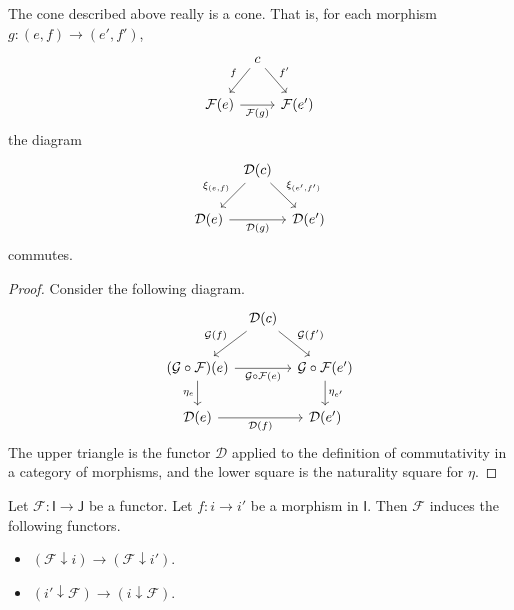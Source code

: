 \documentclass[notes.tex]{subfiles}
\begin{document}
\begin{lemma}
  \label{lemma:right_extension_induces_cone}
  The cone described above really is a cone. That is, for each morphism $g\colon (e, f) \to (e', f')$,
  \begin{equation*}
    \begin{tikzcd}[column sep=tiny]
      & c
      \arrow[ld, swap, "f"]
      \arrow[rd, "f'"]
      \\
      \mathcal{F}(e)
      \arrow[rr, swap, "\mathcal{F}(g)"]
      && \mathcal{F}(e')
    \end{tikzcd}
  \end{equation*}
  the diagram
  \begin{equation*}
    \begin{tikzcd}[column sep=tiny]
      & \mathcal{D}(c)
      \arrow[dl, swap, "\xi_{(e, f)}"]
      \arrow[dr, "\xi_{(e', f')}"]
      \\
      \mathcal{D}(e)
      \arrow[rr, swap, "\mathcal{D}(g)"]
      && \mathcal{D}(e')
    \end{tikzcd}
  \end{equation*}
  commutes.
\end{lemma}
\begin{proof}
  Consider the following diagram.
  \begin{equation*}
    \begin{tikzcd}[column sep=tiny]
      & \mathcal{D}(c)
      \arrow[ld, swap, "\mathcal{G}(f)"]
      \arrow[rd, "\mathcal{G}(f')"]
      \\
      (\mathcal{G} \circ \mathcal{F})(e)
      \arrow[rr, swap, "\mathcal{G} \circ \mathcal{F}(e)"]
      \arrow[d, swap, "\eta_{e}"]
      && \mathcal{G} \circ \mathcal{F}(e')
      \arrow[d, "\eta_{e'}"]
      \\
      \mathcal{D}(e)
      \arrow[rr, swap, "\mathcal{D}(f)"]
      &&\mathcal{D}(e')
    \end{tikzcd}
  \end{equation*}
  The upper triangle is the functor $\mathcal{D}$ applied to the definition of commutativity in a category of morphisms, and the lower square is the naturality square for $\eta$.
\end{proof}

\begin{lemma}
  \label{lemma:morphism_induces_functor_between_comma_categories}
  Let $\mathcal{F}\colon \mathsf{I} \to \mathsf{J}$ be a functor. Let $f\colon i \to i'$ be a morphism in $\mathsf{I}$. Then $\mathcal{F}$ induces the following functors.
  \begin{itemize}
    \item $(\mathcal{F} \downarrow i) \to (\mathcal{F} \downarrow i')$.

    \item $(i' \downarrow \mathcal{F}) \to (i \downarrow \mathcal{F})$.
  \end{itemize}
\end{lemma}
\end{document}
